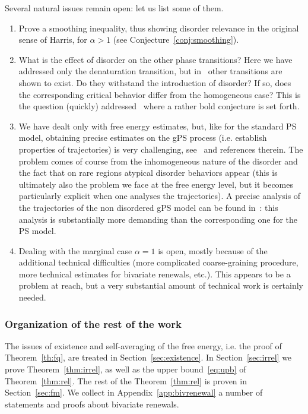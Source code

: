 \documentclass[AHL,Unicode,longabstracts]{cedram}
\newcommand{\ga}{\alpha}
\begin{document}
Several natural issues remain open: let us list some of them.
\begin{enumerate}
\item Prove a smoothing inequality, thus showing disorder relevance in the original sense of Harris, for $\ga>1$ (see Conjecture~\ref{conj:smoothing}).
\item What is the effect of disorder on the other phase transitions? Here we have addressed only the denaturation transition, but in~\cite{cf:GK} other transitions are shown to exist. Do they withstand the introduction of disorder? If so, does the corresponding critical behavior differ from the homogeneous case? This is the question (quickly) addressed~\cite{cf:NG06} where a rather bold conjecture is set forth.
\item We have dealt only with free energy estimates, but, like for the standard PS model, obtaining precise estimates on the gPS process (i.e. establish properties of trajectories) is very challenging, see~\cite[Chapter~8]{cf:G} and references therein. The problem comes of course from the inhomogeneous nature of the disorder and the fact that on rare regions atypical disorder behaviors appear (this is ultimately also the problem we face at the free energy level, but it becomes particularly explicit when one analyses the trajectories). A precise analysis of the trajectories of the non disordered gPS model can be found in~\cite{cf:BGK}: this analysis is substantially more demanding than the corresponding one for the PS model.
\item Dealing with the marginal case $\ga=1$ is open, mostly because of the additional technical difficulties (more complicated coarse-graining procedure, more technical estimates for bivariate renewals, etc.). This appears to be a problem at reach, but a very substantial amount of technical work is certainly needed.
\end{enumerate}

\subsubsection{Organization of the rest of the work}

The issues of existence and self-averaging of the free energy, i.e. the proof of Theorem~\ref{th:fq}, are treated in Section~\ref{sec:existence}. In Section~\ref{sec:irrel} we prove Theorem~\ref{thm:irrel}, as well as the upper bound~\eqref{eq:upb} of Theorem~\ref{thm:rel}. The rest of the Theorem~\ref{thm:rel} is proven in Section~\ref{sec:fm}. We collect in Appendix~\ref{app:bivrenewal} a number of statements and proofs about bivariate renewals.
\end{document}
